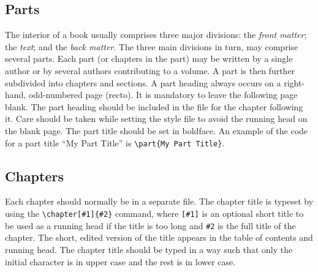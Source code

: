 \subsection{Parts}
The interior of a book usually comprises three major divisions: the
{\it front matter}; the {\it text}; and the {\it back matter}. The
three main divisions in turn, may comprise several parts. Each part
(or chapters in the part) may be written by a single author or by
several authors contributing to a volume. A part is then further
subdivided into chapters and sections. A part heading always occurs
on a right-hand, odd-numbered page (recto). It is mandatory to leave
the following page blank. The part heading should be included in the
file for the chapter following it. Care should be taken while
setting the style file to avoid the running head on the blank page.
The part title should be set in boldface. An example of the code for
a part title ``My Part Title'' is \verb|\part{My Part Title}|.

\subsection{Chapters}
Each chapter should normally be in a separate file. The chapter
title is typeset by using the \verb|\chapter[#1]{#2}| command, where
\verb|[#1]| is an optional short title to be used as a running head
if the title is too long and \verb|#2| is the full title of the
chapter. The short, edited version of the title appears in the table
of contents and running head. The chapter title should be typed in a
way such that only the initial character is in upper case and the
rest is in lower case.

